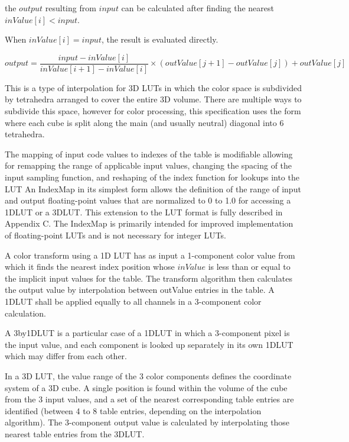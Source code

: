 the $output$ resulting from $input$ can be calculated after finding the nearest $inValue[i] < input$. 

When $inValue[i] = input$, the result is evaluated directly.

\begin{center}
$output = \dfrac{input-inValue[i]}{inValue[i+1]-inValue[i]} \times (outValue[j+1]-outValue[j])+outValue[j]$	
\end{center}
 
This is a type of interpolation for 3D LUTs in which the color space is subdivided by tetrahedra arranged to cover the entire 3D volume.  There are multiple ways to subdivide this space, however for color processing, this specification uses the form where each cube is split along the main (and usually neutral) diagonal into 6 tetrahedra.

The mapping of input code values to indexes of the table is modifiable allowing for remapping the range of applicable input values, changing the spacing of the input sampling function, and reshaping of the index function for lookups into the LUT   An IndexMap in its simplest form allows the definition of the range of input and output floating-point values that are normalized to 0 to 1.0 for accessing a 1DLUT or a 3DLUT. This extension to the LUT format is fully described in Appendix C. The IndexMap is primarily intended for improved implementation of floating-point LUTs and is not necessary for integer LUTs.

A color transform using a 1D LUT has as input a 1-component color value from which it finds the nearest index position whose $inValue$ is less than or equal to the implicit input values for the table. The transform algorithm then calculates the output value by interpolation between outValue entries in the table. A 1DLUT shall be applied equally to all channels in a 3-component color calculation.

A 3by1DLUT is a particular case of a 1DLUT in which a 3-component pixel is the input value, and each component is looked up separately in its own 1DLUT which may differ from each other.

In a 3D LUT, the value range of the 3 color components defines the coordinate system of a 3D cube. A single position is found within the volume of the cube from the 3 input values, and a set of the nearest corresponding table entries are identified (between 4 to 8 table entries, depending on the interpolation algorithm). The 3-component output value is calculated by interpolating those nearest table entries from the 3DLUT.

